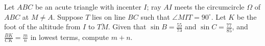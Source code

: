 Let $ABC$ be an acute triangle with incenter $I$; ray $AI$ meets the circumcircle $\Omega$ of $ABC$ at $M \neq A$. Suppose $T$ lies on line $BC$ such that $\angle MIT=90^{\circ}$.
Let $K$ be the foot of the altitude from $I$ to $\overline{TM}$. Given that $\sin B = \frac{55}{73}$ and $\sin C = \frac{77}{85}$, and $\frac{BK}{CK} = \frac mn$ in lowest terms, compute $m+n$.
